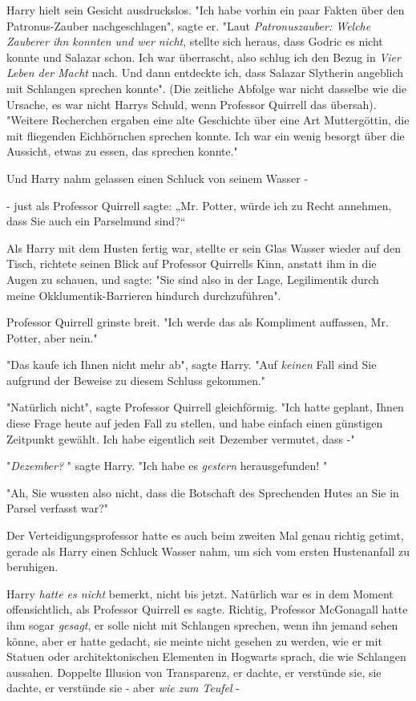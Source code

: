 {Harry hielt sein Gesicht ausdruckslos. "Ich habe vorhin ein paar Fakten über den Patronus-Zauber nachgeschlagen", sagte er. "Laut \emph{Patronuszauber: Welche Zauberer ihn konnten und wer nicht}, stellte sich heraus, dass Godric es nicht konnte und Salazar schon. Ich war überrascht, also schlug ich den Bezug in \emph{Vier Leben der Macht} nach. Und dann entdeckte ich, dass Salazar Slytherin angeblich mit Schlangen sprechen konnte". (Die zeitliche Abfolge war nicht dasselbe wie die Ursache, es war nicht Harrys Schuld, wenn Professor Quirrell das übersah). "Weitere Recherchen ergaben eine alte Geschichte über eine Art Muttergöttin, die mit fliegenden Eichhörnchen sprechen konnte. Ich war ein wenig besorgt über die Aussicht, etwas zu essen, das sprechen konnte."

Und Harry nahm gelassen einen Schluck von seinem Wasser -

- just als Professor Quirrell sagte: „Mr. Potter, würde ich zu Recht annehmen, dass Sie auch ein Parselmund sind?“

Als Harry mit dem Husten fertig war, stellte er sein Glas Wasser wieder auf den Tisch, richtete seinen Blick auf Professor Quirrells Kinn, anstatt ihm in die Augen zu schauen, und sagte: "Sie sind also in der Lage, Legilimentik durch meine Okklumentik-Barrieren hindurch durchzuführen".

Professor Quirrell grinste breit. "Ich werde das als Kompliment auffassen, Mr. Potter, aber nein."

"Das kaufe ich Ihnen nicht mehr ab", sagte Harry. "Auf \emph{keinen} Fall sind Sie aufgrund der Beweise zu diesem Schluss gekommen."

"Natürlich nicht", sagte Professor Quirrell gleichförmig. "Ich hatte geplant, Ihnen diese Frage heute auf jeden Fall zu stellen, und habe einfach einen günstigen Zeitpunkt gewählt. Ich habe eigentlich seit Dezember vermutet, dass -"

"\emph{Dezember?} " sagte Harry. "Ich habe es \emph{gestern} herausgefunden! "

"Ah, Sie wussten also nicht, dass die Botschaft des Sprechenden Hutes an Sie in Parsel verfasst war?"

Der Verteidigungsprofessor hatte es auch beim zweiten Mal genau richtig getimt, gerade als Harry einen Schluck Wasser nahm, um sich vom ersten Hustenanfall zu beruhigen.

Harry \emph{hatte es nicht} bemerkt, nicht bis jetzt. Natürlich war es in dem Moment offensichtlich, als Professor Quirrell es sagte. Richtig, Professor McGonagall hatte ihm sogar \emph{gesagt}, er solle nicht mit Schlangen sprechen, wenn ihn jemand sehen könne, aber er hatte gedacht, sie meinte nicht gesehen zu werden, wie er mit Statuen oder architektonischen Elementen in Hogwarts sprach, die wie Schlangen aussahen. Doppelte Illusion von Transparenz, er dachte, er verstünde sie, sie dachte, er verstünde sie - aber \emph{wie zum Teufel} -

}
